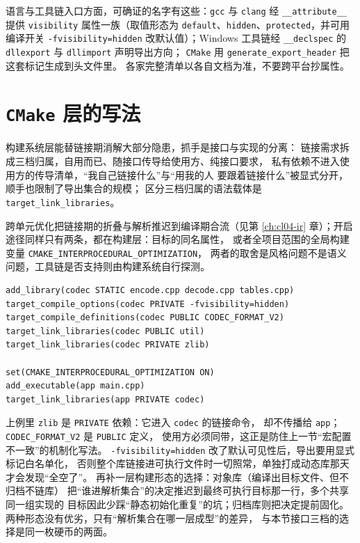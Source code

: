 \documentclass[12pt,a4paper,fontset=fandol]{ctexbook}
\newcommand{\Tool}[1]{\texttt{#1}}
\newcommand{\Sw}[1]{\texttt{#1}}
\newcommand{\Win}{\textsf{Windows}}
\begin{document}
语言与工具链入口方面，可确证的名字有这些：\Tool{gcc} 与 \Tool{clang}
经 \Sw{\_\_attribute\_\_} 提供 \Sw{visibility} 属性一族（取值形态为
\Sw{default}、\Sw{hidden}、\Sw{protected}，并可用编译开关
\Sw{-fvisibility=hidden} 改默认值）；\Win{} 工具链经 \Sw{\_\_declspec}
的 \Sw{dllexport} 与 \Sw{dllimport} 声明导出方向；
\Tool{CMake} 用 \Sw{generate\_export\_header} 把这套标记生成到头文件里。
各家完整清单以各自文档为准，不要跨平台抄属性。

\section{\Tool{CMake} 层的写法}\label{sec:cl08-cmake}

构建系统层能替链接期消解大部分隐患，抓手是接口与实现的分离：
链接需求拆成三档归属，自用而已、随接口传导给使用方、纯接口要求，
私有依赖不进入使用方的传导清单，“我自己链接什么”与“用我的人
要跟着链接什么”被显式分开，顺手也限制了导出集合的规模；
区分三档归属的语法载体是 \Sw{target\_link\_libraries}。

跨单元优化把链接期的折叠与解析推迟到编译期合流（见第
\ref{ch:cl04-ir} 章）；开启途径同样只有两条，都在构建层：目标的同名属性，
或者全项目范围的全局构建变量 \Sw{CMAKE\_INTERPROCEDURAL\_OPTIMIZATION}，
两者的取舍是风格问题不是语义问题，工具链是否支持则由构建系统自行探测。

\begin{lstlisting}[style=cmakestyle, caption={目标级写法：私有依赖、可见性默认值与跨单元优化}]
add_library(codec STATIC encode.cpp decode.cpp tables.cpp)
target_compile_options(codec PRIVATE -fvisibility=hidden)
target_compile_definitions(codec PUBLIC CODEC_FORMAT_V2)
target_link_libraries(codec PUBLIC util)
target_link_libraries(codec PRIVATE zlib)

set(CMAKE_INTERPROCEDURAL_OPTIMIZATION ON)
add_executable(app main.cpp)
target_link_libraries(app PRIVATE codec)
\end{lstlisting}

上例里 \Sw{zlib} 是 \Sw{PRIVATE} 依赖：它进入 \Sw{codec} 的链接命令，
却不传播给 \Sw{app}；\Sw{CODEC\_FORMAT\_V2} 是 \Sw{PUBLIC} 定义，
使用方必须同带，这正是防住上一节“宏配置不一致”的机制化写法。
\Sw{-fvisibility=hidden} 改了默认可见性后，导出要用显式标记白名单化，
否则整个库链接进可执行文件时一切照常，单独打成动态库那天才会发现“全空了”。
再补一层构建形态的选择：对象库（编译出目标文件、但不归档不链库）
把“谁进解析集合”的决定推迟到最终可执行目标那一行，多个共享同一组实现的
目标因此少踩“静态初始化重复”的坑；归档库则把决定提前固化。
两种形态没有优劣，只有“解析集合在哪一层成型”的差异，
与本节接口三档的选择是同一枚硬币的两面。
\end{document}
